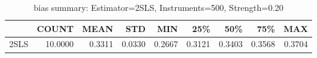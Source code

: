 \begin{table}[ht]
\centering
\caption{bias summary: Estimator=2SLS, Instruments=500, Strength=0.20}
\begin{tabular}{lrrrrrrrr}
\toprule
 & COUNT & MEAN & STD & MIN & 25\% & 50\% & 75\% & MAX \\
\midrule
2SLS & 10.0000 & 0.3311 & 0.0330 & 0.2667 & 0.3121 & 0.3403 & 0.3568 & 0.3704 \\
\bottomrule
\end{tabular}
\end{table}
